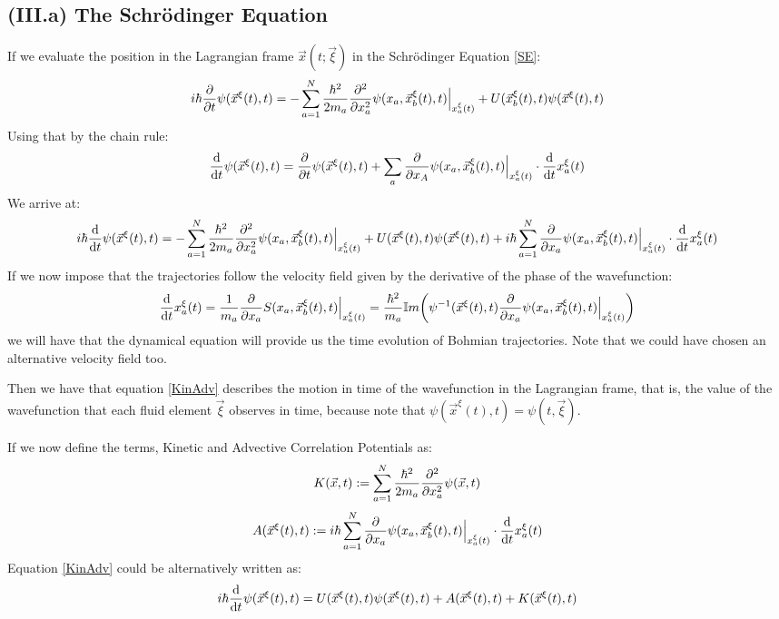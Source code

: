 \documentclass[11pt, a4paper]{article} %
\begin{document}
\subsection*{(III.a) The Schrödinger Equation}
If we evaluate the position in the Lagrangian frame $\vec{x}(t;\vec{\xi})$ in the Schrödinger Equation \eqref{SE}:
\begin{equation}
i\hbar \pdv{}{t}\psi(\vec{x}^\xi(t),t)=-\sum_{a=1}^N \frac{\hbar^2}{2m_a}\pdv[2]{}{x_a}\psi(x_a, \vec{x}_b^\xi(t),t)\Big\rvert_{x^\xi_a(t)}+U(\vec{x}_b^\xi(t),t)\psi(\vec{x}^\xi(t),t)
\end{equation}
Using that by the chain rule:
\begin{equation}
\dv{}{t}\psi(\vec{x}^\xi(t), t)=\pdv{}{t}\psi(\vec{x}^\xi(t), t)+\sum_a \pdv{}{x_A}\psi(x_a,\vec{x}_b^\xi(t), t)\Big\rvert_{x^\xi_a(t)}\cdot \dv{}{t}x^\xi_a(t)
\end{equation}
We arrive at:
\begin{equation}\label{KinAdv}
i\hbar \dv{}{t}\psi(\vec{x}^\xi(t),t)=-\sum_{a=1}^N \frac{\hbar^2}{2m_a}\pdv[2]{}{x_a}\psi(x_a, \vec{x}_b^\xi(t),t)\Big\rvert_{x^\xi_a(t)}+U(\vec{x}^\xi(t),t)\psi(\vec{x}^\xi(t),t)+i\hbar \sum_{a=1}^N  \pdv{}{x_a}\psi(x_a,\vec{x}_b^\xi(t), t)\Big\rvert_{x^\xi_a(t)}\cdot \dv{}{t}x^\xi_a(t)
\end{equation}
If we now impose that the trajectories follow the velocity field given by the derivative of the phase of the wavefunction:
\begin{equation}\label{ImpBohm}
\dv{}{t}x_a^\xi(t)=\frac{1}{m_a}\pdv{}{x_a}S(x_a, \vec{x}_b^\xi(t),t)\Big\rvert_{x^\xi_a(t)}=\frac{\hbar^2}{m_a}\mathbb{I}m \qty( \psi^{-1}(\vec{x}^\xi(t),t)\pdv{}{x_a}\psi(x_a, \vec{x}_b^\xi(t),t)\Big\rvert_{x^\xi_a(t)})
\end{equation}
 we will have that the dynamical equation will provide us the time evolution of Bohmian trajectories. Note that we could have chosen an alternative velocity field too.
 
Then we have that equation \eqref{KinAdv} describes the motion in time of the wavefunction in the Lagrangian frame, that is, the value of the wavefunction that each fluid element $\vec{\xi}$ observes in time, because note that $\psi(\vec{x}^\xi(t),t)=\psi(t, \vec{\xi})$.

If we now define the terms, Kinetic and Advective Correlation Potentials as:
\begin{equation}\label{Kin}
K(\vec{x},t):=\sum_{a=1}^N \frac{\hbar^2}{2m_a}\pdv[2]{}{x_a}\psi(\vec{x},t)
\end{equation}
\begin{equation}\label{Adv}
A(\vec{x}^\xi(t),t):=i\hbar \sum_{a=1}^N \pdv{}{x_a}\psi(x_a,\vec{x}_b^\xi(t), t)\Big\rvert_{x^\xi_a(t)}\cdot \dv{}{t}x^\xi_a(t)
\end{equation}
Equation \eqref{KinAdv} could be alternatively written as:
\begin{equation}
i\hbar \dv{}{t}\psi(\vec{x}^\xi(t),t)=U(\vec{x}^\xi(t),t)\psi(\vec{x}^\xi(t),t)+A(\vec{x}^\xi(t),t)+K(\vec{x}^\xi(t),t)
\end{equation}
\end{document}
